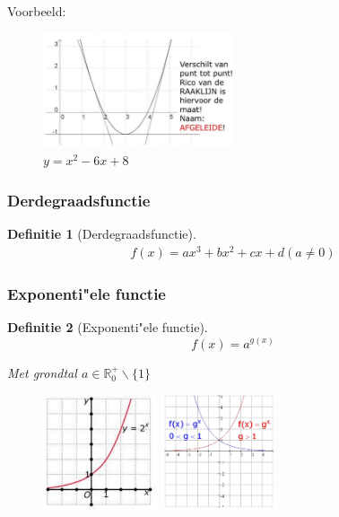 \documentclass{article}
\newtheorem{theorem}{Definitie}[section]
\begin{document}
Voorbeeld: 

\begin{figure}[H]
    \centering
    \includegraphics[width=0.5\textwidth]{functie-2degraad5.png}
    \caption{$y = x^2 - 6x + 8$}
\end{figure}

\subsubsection{Derdegraadsfunctie}

\begin{theorem}[Derdegraadsfunctie]
\begin{equation}
    \begin{aligned}
        f(x) = ax^3 + bx^2 + cx + d
        (a \neq 0)
    \end{aligned}
\end{equation}


\end{theorem}

\subsubsection{Exponenti"ele functie}

\begin{theorem}[Exponenti"ele functie]
\begin{equation}
    f(x) = a^{g(x)}
\end{equation}

Met grondtal $a \in \mathbb{R}_0^+ \backslash \{1\}$
\end{theorem}

\begin{figure}[H]
    \centering
    \includegraphics[width=0.3\textwidth]{functie-exponentieel.png}
    \includegraphics[width=0.3\textwidth]{functie-exponentieel2.png}
    \caption{}
\end{figure}
\end{document}
